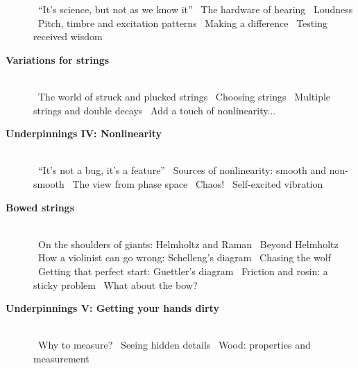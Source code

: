 \begin{description}
\quad{\gre \pageref{s:39a96d9b}}~``It's science, but not as we know it''
\quad{\gre \pageref{s:a7633d81}}~The hardware of hearing
\quad{\gre \pageref{s:6a3af4e9}}~Loudness
\quad{\gre \pageref{s:178c3027}}~Pitch, timbre and excitation patterns
\quad{\gre \pageref{s:8d325f1b}}~Making a difference
\quad{\gre \pageref{s:db51ecad}}~Testing received wisdom
\item[\hspace{-1cm}{\gre{}\pageref{s:44678680}}\hspace{+0cm} \large\bf\sf \blu Variations for strings]\hfill \\ 
\quad{\gre \pageref{s:1362b486}}~The world of struck and plucked strings
\quad{\gre \pageref{s:6ca9cb3c}}~Choosing strings
\quad{\gre \pageref{s:e29cedb3}}~Multiple strings and double decays
\quad{\gre \pageref{s:d0f3f85f}}~Add a touch of nonlinearity...
\item[\hspace{-1cm}{\gre{}\pageref{s:13d5966b}}\hspace{+0cm} \large\bf\sf \blu Underpinnings IV: Nonlinearity]\hfill \\ 
\quad{\gre \pageref{s:c76e1988}}~``It's not a bug, it's a feature''
\quad{\gre \pageref{s:0f985ca9}}~Sources of nonlinearity: smooth and non-smooth
\quad{\gre \pageref{s:5d4387ed}}~The view from phase space
\quad{\gre \pageref{s:73b8e2e1}}~Chaos!
\quad{\gre \pageref{s:53e7f1fb}}~Self-excited vibration
\item[\hspace{-1cm}{\gre{}\pageref{s:8d0a5547}}\hspace{+0cm} \large\bf\sf \blu Bowed strings]\hfill \\ 
\quad{\gre \pageref{s:d4201552}}~On the shoulders of giants: Helmholtz and Raman
\quad{\gre \pageref{s:bd4845bd}}~Beyond Helmholtz
\quad{\gre \pageref{s:f6ce5a19}}~How a violinist can go wrong: Schelleng's diagram
\quad{\gre \pageref{s:66a141bf}}~Chasing the wolf
\quad{\gre \pageref{s:15546596}}~Getting that perfect start: Guettler's diagram
\quad{\gre \pageref{s:72515a88}}~Friction and rosin: a sticky problem
\quad{\gre \pageref{s:031bea39}}~What about the bow?
\item[\hspace{-1cm}{\gre{}\pageref{s:ad3c38a8}}\hspace{+0cm} \large\bf\sf \blu Underpinnings V: Getting your hands dirty]\hfill \\ 
\quad{\gre \pageref{s:a001c3f3}}~Why to measure?
\quad{\gre \pageref{s:20b9da98}}~Seeing hidden details
\quad{\gre \pageref{s:1f6cd60b}}~Wood: properties and measurement

\end{description}
